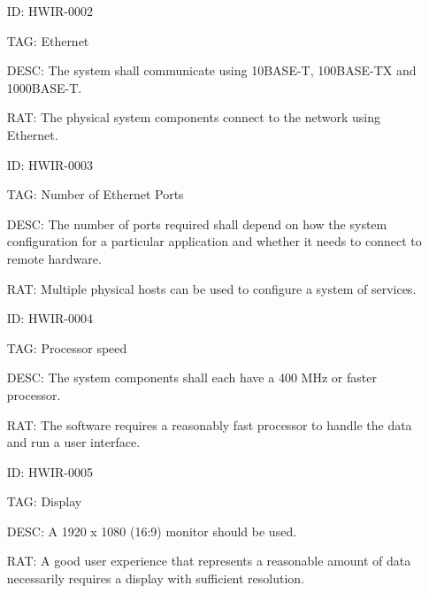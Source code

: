         \newpage

        \begin{itemize}
          \setlength{\itemindent}{.5in}
          \itemsep .15em
          \item[ID:] HWIR-0002
          \item[TAG:] Ethernet
          \item[DESC:] The system shall communicate using 10BASE-T,
            100BASE-TX and 1000BASE-T.
          \item[RAT:] The physical system components connect to the network
            using Ethernet.
        \end{itemize}

        \begin{itemize}
          \setlength{\itemindent}{.5in}
          \itemsep .15em
          \item[ID:] HWIR-0003
          \item[TAG:] Number of Ethernet Ports
          \item[DESC:] The number of ports required shall depend on how the
            system configuration for a particular application and whether it
            needs to connect to remote hardware.
          \item[RAT:] Multiple physical hosts can be used to configure a
            system of services.
        \end{itemize}

        \begin{itemize}
          \setlength{\itemindent}{.5in}
          \itemsep .15em
          \item[ID:] HWIR-0004
          \item[TAG:] Processor speed
          \item[DESC:] The system components shall each have a 400 MHz or
            faster processor.
          \item[RAT:] The software requires a reasonably fast processor to
            handle the data and run a user interface.
        \end{itemize}

        \begin{itemize}
          \setlength{\itemindent}{.5in}
          \itemsep .15em
          \item[ID:] HWIR-0005
          \item[TAG:] Display
          \item[DESC:] A 1920 x 1080 (16:9) monitor should be used.
          \item[RAT:] A good user experience that represents a reasonable
            amount of data necessarily requires a display with sufficient
            resolution.
        \end{itemize}

